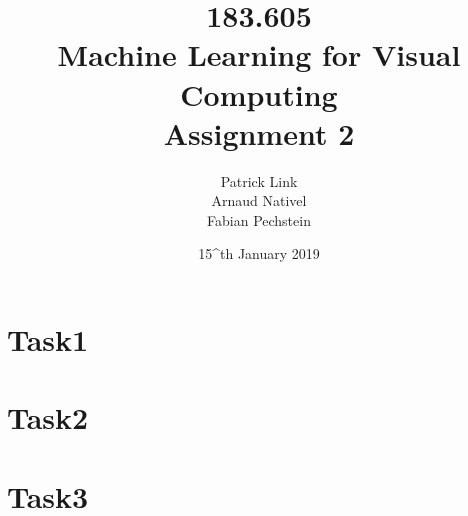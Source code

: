 \documentclass[a4]{article}
\title{\bf 183.605 \\ Machine Learning for Visual Computing \\ Assignment 2}
\author{Patrick Link \\ Arnaud Nativel \\ Fabian Pechstein}
\date{15^{th} January 2019}
\begin{document}
\maketitle
\noindent

\section{Task1}


\section{Task2}



\section{Task3}

\end{document}

